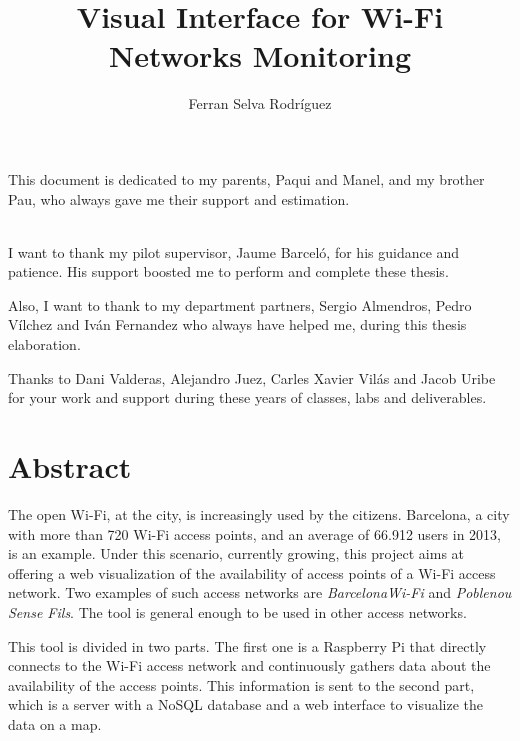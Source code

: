 \documentclass[12pt, a4paper,twoside]{tesi_upf}
\title{Visual Interface for Wi-Fi Networks Monitoring}
\author{Ferran Selva Rodríguez}
\begin{document}
\pdfstringdefDisableCommands{%
\let\MakeUppercase\relax
}

\frontmatter

\maketitle

\cleardoublepage



\noindent This document is dedicated to my parents, Paqui and Manel, and my brother Pau, who always gave me their support and estimation.

\cleardoublepage



\\[12pt] 
I want to thank my pilot supervisor, Jaume Barceló, for his
guidance and patience. His support boosted me to perform and complete these thesis.

Also, I want to thank to my department partners, Sergio Almendros, Pedro Vílchez and Iván Fernandez who always have helped me, during this thesis elaboration. 

Thanks to Dani Valderas, Alejandro Juez, Carles Xavier Vilás and Jacob Uribe for your work and support during these years of classes, labs and deliverables.
\cleardoublepage


\section*{\Large \sffamily Abstract}
The open Wi-Fi, at the city, is increasingly used by the citizens.
Barcelona, a city with more than 720 Wi-Fi access points, and an average of 66.912 users in 2013, is an example. Under this scenario, currently growing, this project aims at offering a web visualization of the availability of access points of a Wi-Fi access network. Two examples of such access networks are \emph{BarcelonaWi-Fi} and \emph{Poblenou Sense Fils}. The tool is general enough to be used in other access networks. 

This tool is divided in two parts. The first one is a Raspberry Pi that directly connects to the Wi-Fi access network and continuously gathers data about the availability of the access points. This information is sent to the second part, which is a server with a NoSQL database and a web interface to visualize the data on a map.
\end{document}
